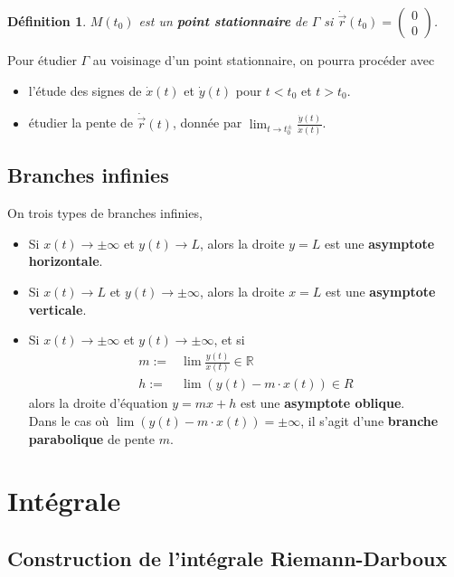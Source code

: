 \documentclass[10pt,a4paper]{book}
\newcommand{\R}{\mathbb{R}}
\newtheorem{definition}{Définition}[section]
\begin{document}
\begin{definition}
$M(t_0)$ est un \textbf{point stationnaire} de $\Gamma$ si $\dot{\vec{r}}(t_0) = \left( \begin{array}{c} 0 \\ 0\end{array} \right)$.
\end{definition}
Pour étudier $\Gamma$ au voisinage d'un point stationnaire, on pourra procéder avec
\begin{itemize}
\item l'étude des signes de $\dot{x}(t)$ et $\dot{y}(t)$ pour $t < t_0$ et $t > t_0$.
\item étudier la pente de $\dot{\vec{r}}(t)$, donnée par $\lim_{t \rightarrow t_0^{\pm}} \frac{\dot{y}(t)}{\dot{x}(t)}$.
\end{itemize}

\section{Branches infinies}

On trois types de branches infinies,
\begin{itemize}
\item Si $x(t)\rightarrow \pm \infty$ et $y(t) \rightarrow L$, alors la droite $y=L$ est une \textbf{asymptote horizontale}.
\item Si $x(t)\rightarrow L$ et $y(t) \rightarrow \pm \infty$, alors la droite $x=L$ est une \textbf{asymptote verticale}.
\item Si $x(t)\rightarrow \pm \infty$ et $y(t) \rightarrow \pm \infty$, et si
\begin{equation*}
\begin{split}
m := & \lim \frac{y(t)}{x(t)} \in \R \\
h := & \lim(y(t) - m\cdot x(t)) \in R
\end{split}
\end{equation*}
alors la droite d'équation $y = mx + h$ est une \textbf{asymptote oblique}. \\
Dans le cas où $\lim(y(t) - m\cdot x(t)) = \pm \infty$, il s'agit d'une \textbf{branche parabolique} de pente $m$.
\end{itemize}

\chapter{Intégrale}

\section{Construction de l'intégrale Riemann-Darboux}
\end{document}
